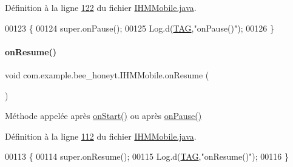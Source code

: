 Définition à la ligne \hyperlink{_i_h_m_mobile_8java_source_l00122}{122} du fichier \hyperlink{_i_h_m_mobile_8java_source}{I\+H\+M\+Mobile.\+java}.


\begin{DoxyCode}
00123     \{
00124         super.onPause();
00125         Log.d(\hyperlink{classcom_1_1example_1_1bee__honeyt_1_1_i_h_m_mobile_a366987bf9bb2ed1010b2f967d4efa263}{TAG},\textcolor{stringliteral}{"onPause()"});
00126     \}
\end{DoxyCode}
\mbox{\label{classcom_1_1example_1_1bee__honeyt_1_1_i_h_m_mobile_aa8e9489786f095aee58ae5895b118ef6}} 
\paragraph{\texorpdfstring{on\+Resume()}{onResume()}}
{\footnotesize\ttfamily void com.\+example.\+bee\+\_\+honeyt.\+I\+H\+M\+Mobile.\+on\+Resume (\begin{DoxyParamCaption}{ }\end{DoxyParamCaption})\hspace{0.3cm}{\ttfamily [protected]}}



Méthode appelée après \hyperlink{classcom_1_1example_1_1bee__honeyt_1_1_i_h_m_mobile_abab25414f97d4793152b39c2deb8365b}{on\+Start()} ou après \hyperlink{classcom_1_1example_1_1bee__honeyt_1_1_i_h_m_mobile_a8b2f247beaf4e5f146c579b38d8bdee9}{on\+Pause()} 



Définition à la ligne \hyperlink{_i_h_m_mobile_8java_source_l00112}{112} du fichier \hyperlink{_i_h_m_mobile_8java_source}{I\+H\+M\+Mobile.\+java}.


\begin{DoxyCode}
00113     \{
00114         super.onResume();
00115         Log.d(\hyperlink{classcom_1_1example_1_1bee__honeyt_1_1_i_h_m_mobile_a366987bf9bb2ed1010b2f967d4efa263}{TAG},\textcolor{stringliteral}{"onResume()"});
00116     \}
\end{DoxyCode}
\mbox{\label{classcom_1_1example_1_1bee__honeyt_1_1_i_h_m_mobile_abab25414f97d4793152b39c2deb8365b}} 
